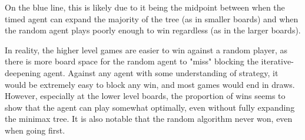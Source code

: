 \begin{center}
\end{center}

On the blue line, this is likely due to it being the midpoint between when the timed agent can expand the majority of the tree (as in smaller boards) and when the random agent plays poorly enough to win regardless (as in the larger boards).

In reality, the higher level games are easier to win against a random player, as there is more board space for the random agent to "miss" blocking the iterative-deepening agent. Against any agent with some understanding of strategy, it would be extremely easy to block any win, and most games would end in draws. However, especially at the lower level boards, the proportion of wins seems to show that the agent can play somewhat optimally, even without fully expanding the minimax tree. It is also notable that the random algorithm never won, even when going first.